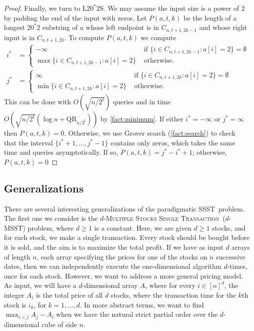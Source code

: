 \documentclass[12pt]{article}
\newcommand{\qr}{\mathrm{QR}}
\newcommand{\SSST}{\textsc{SSST}}
\newcommand{\LZS}{\textsc{L}$20^*2$\textsc{S}}
\newcommand{\MSSTf}{\textsc{Multiple Stocks Single Transaction}}
\newcommand{\MSST}{\textsc{MSST}}
\theoremstyle{definition}
\begin{document}
\begin{proof}
Finally, we turn to \LZS.  We may assume the input size is a power of 2 by padding the end of the input with zeros. Let $P(a, t, k)$ be the length of a longest $20^*2$ substring of $a$ whose left endpoint is in $C_{n, t+1, 2k-1}$ and whose right input is in $C_{n, t+1, 2k}$.  To compute $P(a, t, k)$ we compute 
\begin{align*}
i^* &= 
\begin{cases}
- \infty & \text{ if } \{i \in C_{n, t+1, 2k-1} : a[i] = 2\} = \emptyset \\
\max \{i \in C_{n, t+1, 2k-1} : a[i] = 2\} & \text{ otherwise.} 
\end{cases} \\
j^* &= 
\begin{cases}
\infty & \text{ if } \{i \in C_{n, t+1, 2k} : a[i] = 2\} = \emptyset \\
\min \{i \in C_{n, t+1, 2k} : a[i] = 2\} & \text{ otherwise.}
\end{cases}
\end{align*}
This can be done with $O(\sqrt{n/2^t})$ queries and in time $O(\sqrt{n/2^t} (\log n + \qr_{n/2^t}))$ by \cref{fact:minimum}. If 
either $i^* = -\infty$ or $j^* = \infty$ then $P(a, t, k) = 0$. Otherwise, we use Grover search (\cref{fact:search}) to check that the interval $\{i^*+1, \ldots, j^*-1\}$ contains only zeros, which takes the same time and queries asymptotically. 
If so, $P(a, t, k) = j^* - i^* + 1$; otherwise, $P(a, t, k) = 0$
\end{proof}

\subsection{Generalizations}
There are several interesting generalizations of the paradigmatic \SSST \ problem. The first one we consider is the $d$-\MSSTf \  ($d$-\MSST) problem, where $d \geq 1$ is a constant. Here, we are given $d \geq 1$ stocks, and for each stock, we make a single transaction. Every stock should be bought before it is sold, and the aim is to maximize the total profit. 
If we have as input $d$ arrays of length $n$, each array specifying the prices for one of the stocks on $n$ successive dates, then we can independently execute the one-dimensional algorithm $d$-times, once for each stock.
However, we want to address a more general pricing model.  
As input, we will have a $d$-dimensional array $A$, where for every $i \in [n]^d$, the integer $A_i$ is the total price of all $d$ stocks, where the transaction time for the $k$th stock is $i_k$, for $k = 1, \ldots, d$. 
In more abstract terms, we want to find $\max_{i < j} A_j - A_i$ when we have the natural strict partial order over the $d$-dimensional cube of side $n$.
\end{document}
